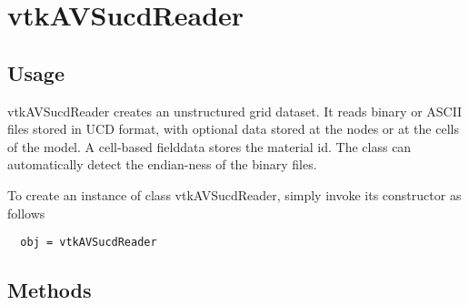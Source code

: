 \section{vtkAVSucdReader}

\subsection{Usage}

 vtkAVSucdReader creates an unstructured grid dataset. It reads binary or
 ASCII files stored in UCD format, with optional data stored at the nodes
 or at the cells of the model. A cell-based fielddata stores the material
 id. The class can automatically detect the endian-ness of the binary files.

To create an instance of class vtkAVSucdReader, simply
invoke its constructor as follows
\begin{verbatim}
  obj = vtkAVSucdReader
\end{verbatim}
\subsection{Methods}

